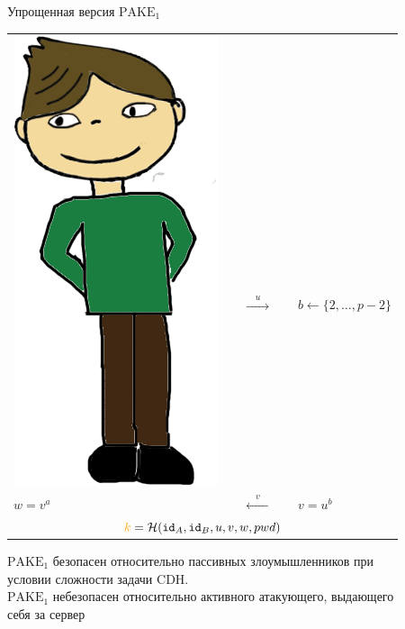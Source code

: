 \documentclass[usenames,dvipsnames,8pt,aspectratio=169]{beamer}
\begin{document}
\begin{frame}{Упрощенная версия $\text{PAKE}_1$}
\begin{center}
\begin{center}
\begin{tabular}{l c c c l}
			\multirow{2}{*}{\includegraphics[scale=0.15]{Bob}} &    \\[10pt]
			$ a \leftarrow \{2, \ldots, p-2 \}$ & & {\Huge $\xrightarrow{\quad u  \quad }$}&  &\hspace{-30pt} $b \leftarrow \{2, \ldots, p-2 \}$ \\
			\huge $w = v^a$& &  {\Huge $\xleftarrow{\quad v  \quad }$}&  & \hspace{-30pt}\huge $v = u^b$ \\[20pt]
			\multicolumn{5}{c}{ \LARGE ${\color{Orange}k} =\Hash(\mathtt{id}_{A}, \mathtt{id}_{B}, u, v, w, pwd) $}   \\
		\end{tabular}
	\end{center}
\end{center}
	$\text{PAKE}_1$ безопасен относительно {\color{Orange} пассивных} злоумышленников  при \\ условии сложности задачи CDH. \\[5pt]
	$\text{PAKE}_1$  небезопасен относительно {\color{Orange}активного} атакующего, выдающего \\ себя за сервер
\end{frame}
\end{document}
